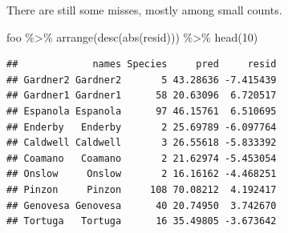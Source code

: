 \documentclass[
  ignorenonframetext,
]{beamer}
\newenvironment{Shaded}{\begin{snugshade}}{\end{snugshade}}
\newcommand{\DecValTok}[1]{\textcolor[rgb]{0.00,0.00,0.81}{#1}}
\newcommand{\FunctionTok}[1]{\textcolor[rgb]{0.00,0.00,0.00}{#1}}
\newcommand{\NormalTok}[1]{#1}
\newcommand{\SpecialCharTok}[1]{\textcolor[rgb]{0.00,0.00,0.00}{#1}}
\begin{document}
\begin{frame}[fragile]{}
\protect\hypertarget{section-18}{}
There are still some misses, mostly among small counts.

\vspace{12pt}
\tiny

\begin{Shaded}
\begin{Highlighting}[]
\NormalTok{foo }\SpecialCharTok{\%\textgreater{}\%} \FunctionTok{arrange}\NormalTok{(}\FunctionTok{desc}\NormalTok{(}\FunctionTok{abs}\NormalTok{(resid))) }\SpecialCharTok{\%\textgreater{}\%} \FunctionTok{head}\NormalTok{(}\DecValTok{10}\NormalTok{)}
\end{Highlighting}
\end{Shaded}

\begin{verbatim}
##             names Species     pred     resid
## Gardner2 Gardner2       5 43.28636 -7.415439
## Gardner1 Gardner1      58 20.63096  6.720517
## Espanola Espanola      97 46.15761  6.510695
## Enderby   Enderby       2 25.69789 -6.097764
## Caldwell Caldwell       3 26.55618 -5.833392
## Coamano   Coamano       2 21.62974 -5.453054
## Onslow     Onslow       2 16.16162 -4.468251
## Pinzon     Pinzon     108 70.08212  4.192417
## Genovesa Genovesa      40 20.74950  3.742670
## Tortuga   Tortuga      16 35.49805 -3.673642
\end{verbatim}
\end{frame}
\end{document}
